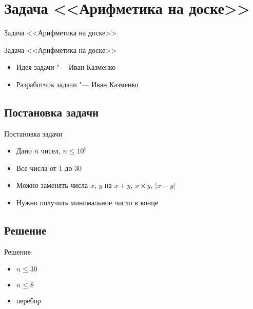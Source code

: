 \section{Задача <<Арифметика на доске>>}

\begin{frame}[t]{Задача <<Арифметика на доске>>}

  \begin{center}
    \LARGE Задача <<Арифметика на доске>>
  \end{center}

  \begin{itemize}
    \item Идея задачи "--- Иван Казменко
    \item Разработчик задачи "--- Иван Казменко
  \end{itemize}
\end{frame}

\subsection{Постановка задачи}

\begin{frame}[t]{Постановка задачи}
\begin{itemize}
	\item Дано $n$ чисел, $n \le 10^5$
	\item Все числа от 1 до 30
	\item Можно заменять числа $x$, $y$ на $x + y$, $x \times y$, $|x - y|$
	\item Нужно получить минимальное число в конце
\end{itemize}
\end{frame}

\subsection{Решение}

\begin{frame}[t]{Решение}
\begin{itemize}
	\item $n \le 30$
	\item $n \le 8$
	\item перебор
\end{itemize}
\end{frame}
